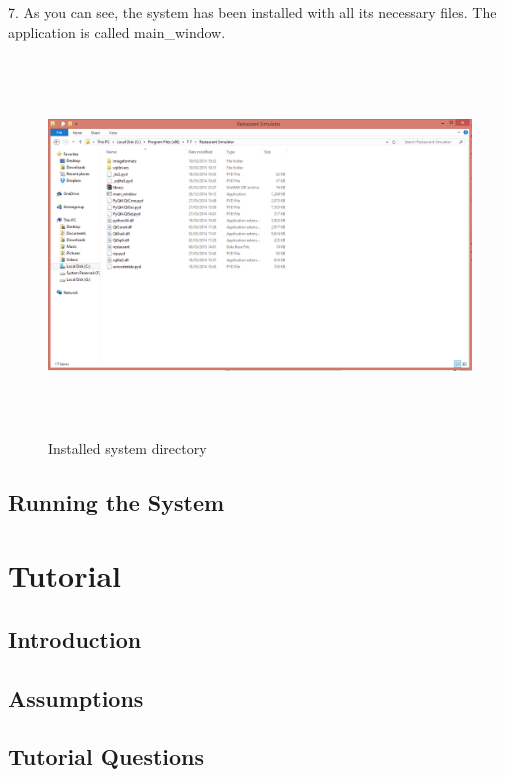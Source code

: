 \begin{landscape}
7. As you can see, the system has been installed with all its necessary files. The application is called main\_window.

\begin{figure}[H]
    \includegraphics[height = 10cm]{./Manual/images/install7} 
    \caption{Installed system directory} \label{fig:install7}
\end{figure}

\end{landscape}
\subsection{Running the System}

\section{Tutorial}

\subsection{Introduction}

\subsection{Assumptions}

\subsection{Tutorial Questions}

